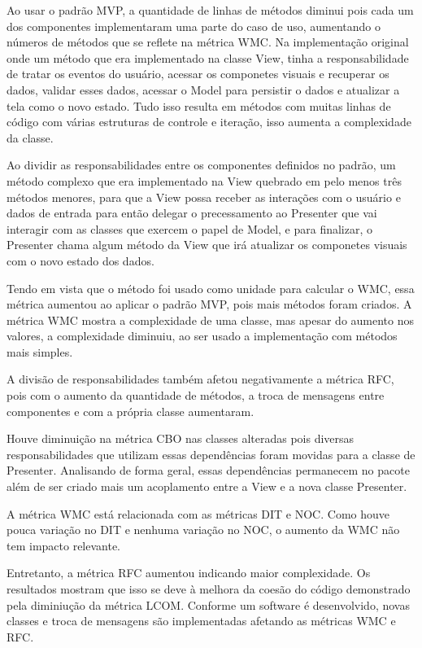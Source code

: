 Ao usar o padrão MVP, a quantidade de linhas de métodos diminui pois cada um
dos componentes implementaram uma parte do caso de uso, aumentando o números de
métodos que se reflete na métrica WMC. Na implementação original onde um método
que era implementado na classe View, tinha a  responsabilidade de tratar os
eventos do usuário, acessar os componetes visuais e recuperar os dados, validar
esses dados, acessar o Model para persistir o dados e atualizar a tela como o
novo estado. Tudo isso resulta em métodos com muitas linhas de código com várias
estruturas de controle e iteração, isso aumenta a complexidade da classe.

Ao dividir as responsabilidades entre os componentes definidos no padrão, um
método complexo que era implementado na View quebrado em pelo menos três métodos
menores, para que a View possa receber as interações com o usuário e dados de
entrada para então delegar o precessamento ao Presenter que vai interagir com as
classes que exercem o papel de Model, e para finalizar, o Presenter chama algum
método da View que irá atualizar os componetes visuais com o novo estado dos
dados.

Tendo em vista que o método foi usado como unidade para calcular o WMC, essa
métrica aumentou ao aplicar o padrão MVP, pois mais métodos foram criados. A
métrica WMC mostra a complexidade de uma classe, mas apesar do aumento nos
valores, a complexidade diminuiu, ao ser usado a implementação com métodos mais
simples.


A divisão de responsabilidades também afetou negativamente a métrica RFC, pois
com o aumento da quantidade de métodos, a troca de mensagens entre componentes
e com a própria classe aumentaram.  

Houve diminuição na métrica CBO nas classes alteradas pois diversas
responsabilidades que utilizam essas dependências foram movidas para a classe de
Presenter. Analisando de forma geral, essas dependências permanecem no pacote
além de ser criado mais um acoplamento entre a View e a nova classe Presenter.

A métrica WMC está relacionada com as métricas DIT e NOC. Como houve pouca
variação no DIT e nenhuma variação no NOC, o aumento da WMC não tem impacto
relevante. 

Entretanto, a métrica RFC aumentou indicando maior complexidade. Os
resultados mostram que isso se deve à melhora da coesão do código demonstrado pela
diminiução da métrica LCOM. Conforme um software é desenvolvido, novas classes e
troca de mensagens são implementadas afetando as métricas WMC e RFC. 

